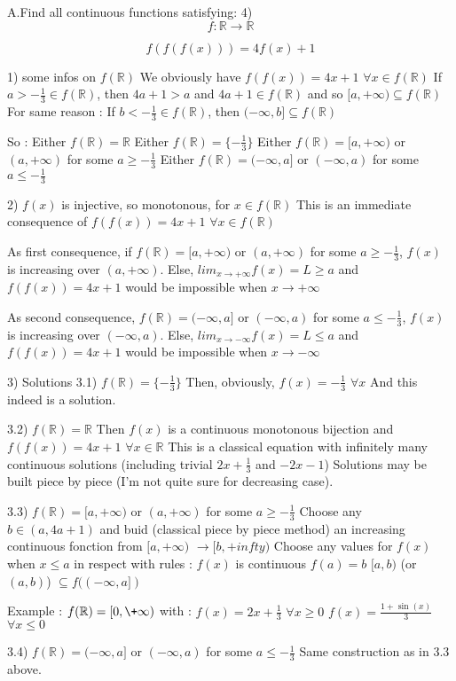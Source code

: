 \begin{solution}
	\begin{tcolorbox}A.Find all continuous  functions satisfying:
4)
\[ f: \mathbb R \to \mathbb R
\]

\[ f(f(f(x))) = 4f(x) + 1
\]
\end{tcolorbox}

1) some infos on $ f(\mathbb R)$
We obviously have $ f(f(x))=4x+1$ $ \forall x\in f(\mathbb R)$
If $ a>-\frac 13\in f(\mathbb R)$, then $ 4a+1>a$ and $ 4a+1\in f(\mathbb R)$ and so $ [a,+\infty)\subseteq f(\mathbb R)$
For same reason : If $ b<-\frac 13\in f(\mathbb R)$, then $ (-\infty,b]\subseteq f(\mathbb R)$

So :
Either $ f(\mathbb R)=\mathbb R$
Either $ f(\mathbb R)=\{-\frac 13\}$
Either $ f(\mathbb R)=[a,+\infty)$ or $ (a,+\infty)$ for some $ a\geq -\frac 13$
Either $ f(\mathbb R)=(-\infty,a]$ or $ (-\infty,a)$ for some $ a\leq -\frac 13$

2) $ f(x)$ is injective, so monotonous, for $ x\in f(\mathbb R)$
This is an immediate consequence of $ f(f(x))=4x+1$ $ \forall x\in f(\mathbb R)$

As first consequence, if $ f(\mathbb R)=[a,+\infty)$ or $ (a,+\infty)$ for some $ a\geq -\frac 13$, $ f(x)$ is increasing over $ (a,+\infty)$.
Else, $ lim_{x\to +\infty}f(x)=L\geq a$ and $ f(f(x))=4x+1$ would be impossible when $ x\to +\infty$

As second consequence, $ f(\mathbb R)=(-\infty,a]$ or $ (-\infty,a)$ for some $ a\leq -\frac 13$, $ f(x)$ is increasing over $ (-\infty,a)$.
Else, $ lim_{x\to -\infty}f(x)=L\leq a$ and $ f(f(x))=4x+1$ would be impossible when $ x\to -\infty$

3) Solutions
3.1) $ f(\mathbb R)=\{-\frac 13\}$
Then, obviously, $ f(x)=-\frac 13$ $ \forall x$
And this indeed is a solution.

3.2) $ f(\mathbb R)=\mathbb R$
Then $ f(x)$ is a continuous monotonous bijection and $ f(f(x))=4x+1$ $ \forall x\in\mathbb R$
This is a classical equation with infinitely many continuous solutions (including trivial $ 2x+\frac 13$ and $ -2x-1$)
Solutions may be built piece by piece (I'm not quite sure for decreasing case).

3.3) $ f(\mathbb R)=[a,+\infty)$ or $ (a,+\infty)$ for some $ a\geq -\frac 13$
Choose any $ b\in (a,4a+1)$ and buid (classical piece by piece method) an increasing continuous fonction from $ [a,+\infty)$ $ \to[b,+infty)$
Choose any values for $ f(x)$ when $ x\leq a$ in respect with rules :
$ f(x)$ is continuous
$ f(a)=b$
$ [a,b)$ (or $ (a,b)$) $ \subseteq f((-\infty,a])$

Example :
$ f(\mathbb R)=[0,\+\infty)$ with :
$ f(x)=2x+\frac 13$ $ \forall x\geq 0$
$ f(x)=\frac{1+\sin(x)}{3}$ $ \forall x\leq 0$

3.4) $ f(\mathbb R)=(-\infty,a]$ or $ (-\infty,a)$ for some $ a\leq -\frac 13$
Same construction as in 3.3 above.
\end{solution}



